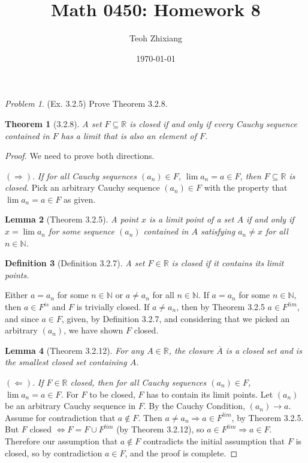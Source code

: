 \documentclass[11pt,twoside, reqno]{amsart}
\newtheorem{Thm}{Theorem}
\newtheorem{Def}[Thm]{Definition}
\newtheorem{Lm}[Thm]{Lemma}
\theoremstyle{remark}
\newtheorem{Prob}{Problem}
\def\R{\mathbb R}
\def\N{\mathbb N}
\renewcommand{\implies}{\Rightarrow}
\newcommand{\implied}{\Leftarrow}
\renewcommand{\iff}{\Leftrightarrow}
\begin{document}
\title{Math 0450: Homework 8}
\date{\today}
\author{Teoh Zhixiang}

\maketitle

\begin{Prob}(Ex. 3.2.5) Prove Theorem 3.2.8.
\begin{Thm}[3.2.8]
A set $F \subseteq \R$ is closed if and only if every Cauchy sequence contained in $F$ has a limit that is also an element of $F$.
\end{Thm}

\end{Prob}

\begin{proof}
We need to prove both directions.

$(\implies)$. \textit{If for all Cauchy sequences $(a_n) \in F$, $\lim a_n = a \in F$, then $F \subseteq \R$ is closed.} Pick an arbitrary Cauchy sequence $(a_n) \in F$ with the property that $\lim a_n = a \in F$ as given. 
\begin{Lm}[Theorem 3.2.5]
A point $x$ is a limit point of a set $A$ if and only if $x = \lim a_n$ for some sequence $(a_n)$ contained in $A$ satisfying $a_n \neq x$ for all $n \in \N$.
\end{Lm}
\begin{Def}[Definition 3.2.7]
A set $F \in \R$ is \textit{closed} if it contains its limit points.
\end{Def}
Either $a = a_n$ for some $n \in \N$ or $a \neq a_n$ for all $n \in \N$. If $a = a_n$ for some $n \in \N$, then $a \in F^{is}$ and $F$ is trivially closed. If $a \neq a_n$, then by Theorem 3.2.5 $a \in F^{lim}$, and since $a \in F$, given, by Definition 3.2.7, and considering that we picked an arbitrary $(a_n)$, we have shown $F$ closed.

\begin{Lm}[Theorem 3.2.12]
For any $A \in \R$, the closure $\overline{A}$ is a closed set and is the smallest closed set containing $A$.
\end{Lm}

$(\implied)$. \textit{If $F \in \R$ closed, then for all Cauchy sequences $(a_n) \in F$, $\lim a_n = a \in F$.} For $F$ to be closed, $F$ has to contain its limit points. Let $(a_n)$ be an arbitrary Cauchy sequence in $F$. By the Cauchy Condition, $(a_n) \to a$. Assume for contradiction that $a \not \in F$. Then $a \neq a_n \implies a \in F^{lim}$, by Theorem 3.2.5. But $F$ closed $\iff F = F \cup F^{lim}$ (by Theorem 3.2.12), so $a \in F^{lim} \implies a \in F$. Therefore our assumption that $a \not \in F$ contradicts the initial assumption that $F$ is closed, so by contradiction $a \in F$, and the proof is complete.

\end{proof}
\end{document}
